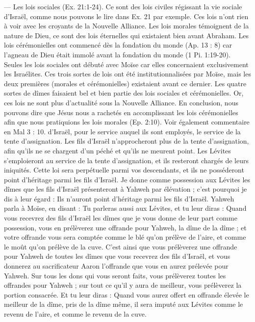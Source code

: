 \begin{multicols}{2}
{— Les lois sociales (Ex. 21:1-24). Ce sont des lois civiles régissant la vie sociale d’Israël, comme nous pouvons le lire dans Ex. 21 par exemple. Ces lois n’ont rien à voir avec les croyants de la Nouvelle Alliance. Les lois morales témoignent de la nature de Dieu, ce sont des lois éternelles qui existaient bien avant Abraham. Les lois cérémonielles ont commencé dès la fondation du monde (Ap. 13 : 8) car l’agneau de Dieu était immolé avant la fondation du monde (1 Pi. 1:19-20). Seules les lois sociales ont débuté avec Moïse car elles concernaient exclusivement les Israélites. Ces trois sortes de lois ont été institutionnalisées par Moïse, mais les deux premières (morales et cérémonielles) existaient avant ce dernier. Les quatre sortes de dîmes faisaient bel et bien partie des lois sociales et cérémonielles. Or, ces lois ne sont plus d’actualité sous la Nouvelle Alliance. En conclusion, nous pouvons dire que Jésus nous a rachetés en accomplissant les lois cérémonielles afin que nous pratiquions les lois morales (Ep. 2:10). Voir  également commentaire en Mal 3 : 10.} d'Israël, pour le service auquel ils sont employés, le service de la tente d'assignation.
Les fils d'Israël n'approcheront plus de la tente d'assignation, afin qu'ils ne se chargent d’un péché et qu'ils ne meurent point.
Les Lévites s'emploieront au service de la tente d'assignation, et ils resteront chargés de leurs iniquités. Cette loi sera perpétuelle parmi vos descendants, et ils ne posséderont point d'héritage parmi les fils d'Israël.
Je donne comme possession aux Lévites les dîmes que les fils d'Israël présenteront à Yahweh par élévation ; c'est pourquoi je dis à leur égard : Ils n'auront point d'héritage parmi les fils d'Israël.
Yahweh parla à Moïse, en disant :
Tu parleras aussi aux Lévites, et tu leur diras : Quand vous recevrez des fils d'Israël les dîmes que je vous donne de leur part comme possession, vous en prélèverez une offrande pour Yahweh, la dîme de la dîme ;
et votre offrande vous sera comptée comme le blé qu’on prélève de l'aire, et comme le moût qu’on prélève de la cuve.
C’est ainsi que vous prélèverez une offrande pour Yahweh de toutes les dîmes que vous recevrez des fils d'Israël, et vous donnerez au sacrificateur Aaron l’offrande que vous en aurez prélevée pour Yahweh.
Sur tous les dons qui vous seront faits, vous prélèverez toutes les offrandes pour Yahweh ; sur tout ce qu'il y aura de meilleur, vous prélèverez la portion consacrée.
Et tu leur diras : Quand vous aurez offert en offrande élevée le meilleur de la dîme, pris de la dîme même, il sera imputé aux Lévites comme le revenu de l'aire, et comme le revenu de la cuve.

\end{multicols}
